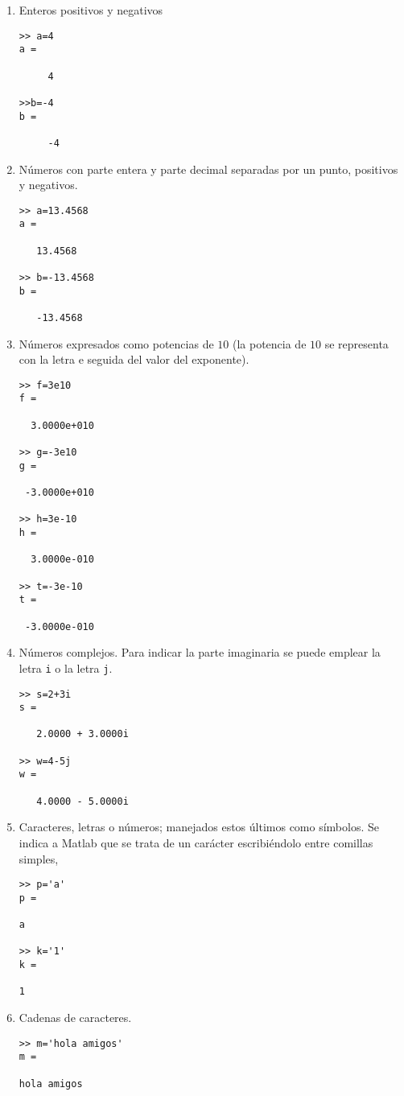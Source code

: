 \begin{enumerate}
\item Enteros positivos y negativos
\begin{verbatim}
>> a=4
a =

     4

>>b=-4
b =

     -4

\end{verbatim}
\item Números con parte entera y parte decimal separadas por un punto, positivos y negativos.
\begin{verbatim}
>> a=13.4568
a =

   13.4568

>> b=-13.4568
b =

   -13.4568
\end{verbatim}


\item Números expresados como potencias de $10$ (la potencia de $10$ se representa con la letra e seguida del valor del exponente). 
\begin{verbatim}
>> f=3e10
f =

  3.0000e+010

>> g=-3e10
g =

 -3.0000e+010

>> h=3e-10
h =

  3.0000e-010

>> t=-3e-10
t =

 -3.0000e-010
 \end{verbatim}
 
\item Números complejos. Para indicar la parte imaginaria se puede emplear la letra \texttt{i} o la letra \texttt{j}.

\begin{verbatim}
>> s=2+3i
s =

   2.0000 + 3.0000i

>> w=4-5j
w =

   4.0000 - 5.0000i
\end{verbatim}

\item Caracteres, letras o números; manejados estos últimos como símbolos. Se indica a Matlab que se trata de un carácter escribiéndolo entre comillas simples,
\begin{verbatim}
>> p='a'
p =

a

>> k='1'
k =

1
\end{verbatim}

\item Cadenas de caracteres. 
\begin{verbatim}
>> m='hola amigos'
m =

hola amigos
\end{verbatim}

\end{enumerate}

